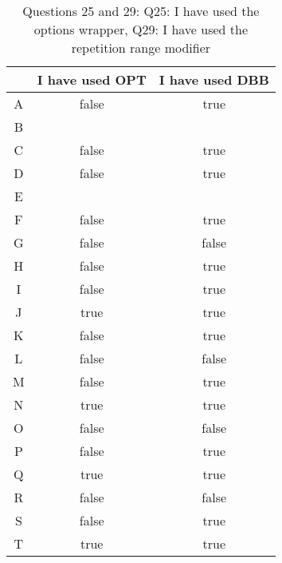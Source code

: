 \begin{table}[!htbp]
\centering
\begin{tabular}{|c|c|c|}
\hline
 & I have used OPT & I have used DBB\\
\hline
A & false & true\\
\hline
B &  & \\
\hline
C & false & true\\
\hline
D & false & true\\
\hline
E &  & \\
\hline
F & false & true\\
\hline
G & false & false\\
\hline
H & false & true\\
\hline
I & false & true\\
\hline
J & true & true\\
\hline
K & false & true\\
\hline
L & false & false\\
\hline
M & false & true\\
\hline
N & true & true\\
\hline
O & false & false\\
\hline
P & false & true\\
\hline
Q & true & true\\
\hline
R & false & false\\
\hline
S & false & true\\
\hline
T & true & true\\
\hline
\hline\end{tabular}
\label{table:surveyQ2529}
\caption{\small{Questions 25 and 29: Q25: I have used the options wrapper, Q29: I have used the repetition range modifier }}
\end{table}
